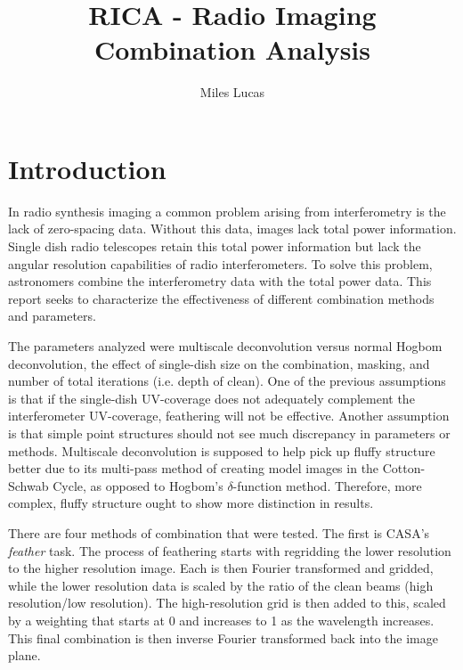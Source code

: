 \documentclass[manuscript,linenumbers]{aastex62}
\begin{document}
\title{RICA - Radio Imaging Combination Analysis}
\author{Miles Lucas}
 

\begin{abstract}

\end{abstract}


\section{Introduction}

In radio synthesis imaging a common problem arising from interferometry is the lack of zero-spacing data. Without this data, images lack total power information. Single dish radio telescopes retain this total power information but lack the angular resolution capabilities of radio interferometers. To solve this problem, astronomers combine the interferometry data with the total power data. This report seeks to characterize the effectiveness of different combination methods and parameters.

The parameters analyzed were multiscale deconvolution versus normal Hogbom deconvolution, the effect of single-dish size on the combination, masking, and number of total iterations (i.e. depth of clean). One of the previous assumptions is that if the single-dish UV-coverage does not adequately complement the interferometer UV-coverage, feathering will not be effective. Another assumption is that simple point structures should not see much discrepancy in parameters or methods. Multiscale deconvolution is supposed to help pick up fluffy structure better due to its multi-pass method of creating model images in the Cotton-Schwab Cycle, as opposed to Hogbom's $\delta$-function method. Therefore, more complex, fluffy structure ought to show more distinction in results.

There are four methods of combination that were tested. The first is CASA's \textit{feather} task. The process of feathering starts with regridding the lower resolution to the higher resolution image. Each is then Fourier transformed and gridded, while the lower resolution data is scaled by the ratio of the clean beams (high resolution/low resolution). The high-resolution grid is then added to this, scaled by a weighting that starts at 0 and increases to 1 as the wavelength increases. This final combination is then inverse Fourier transformed back into the image plane. 
\end{document}
